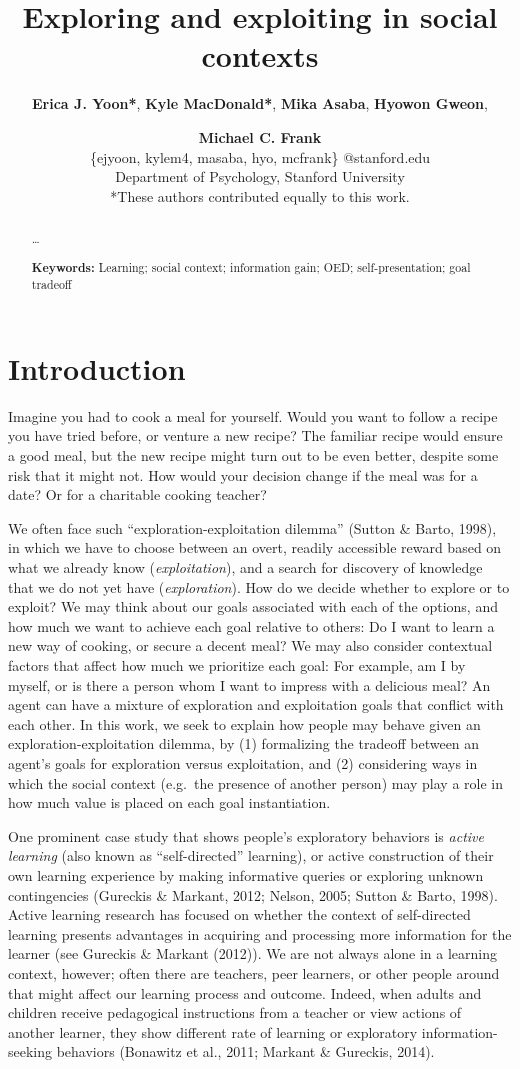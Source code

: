 \documentclass[10pt, letterpaper]{article}
\title{Exploring and exploiting in social contexts}
\author{{\large \bf Erica J. Yoon*}, {\large \bf Kyle MacDonald*}, {\large \bf Mika Asaba}, {\large \bf Hyowon Gweon}, \and {\large \bf Michael C. Frank} \\ \{ejyoon, kylem4, masaba, hyo, mcfrank\} @stanford.edu \\ Department of Psychology, Stanford University \\ *These authors contributed equally to this work.}
\begin{document}
\maketitle

\begin{abstract}
\ldots{}

\textbf{Keywords:}
Learning; social context; information gain; OED; self-presentation; goal
tradeoff
\end{abstract}

\section{Introduction}\label{introduction}

Imagine you had to cook a meal for yourself. Would you want to follow a
recipe you have tried before, or venture a new recipe? The familiar
recipe would ensure a good meal, but the new recipe might turn out to be
even better, despite some risk that it might not. How would your
decision change if the meal was for a date? Or for a charitable cooking
teacher?

We often face such ``exploration-exploitation dilemma'' (Sutton \&
Barto, 1998), in which we have to choose between an overt, readily
accessible reward based on what we already know (\emph{exploitation}),
and a search for discovery of knowledge that we do not yet have
(\emph{exploration}). How do we decide whether to explore or to exploit?
We may think about our goals associated with each of the options, and
how much we want to achieve each goal relative to others: Do I want to
learn a new way of cooking, or secure a decent meal? We may also
consider contextual factors that affect how much we prioritize each
goal: For example, am I by myself, or is there a person whom I want to
impress with a delicious meal? An agent can have a mixture of
exploration and exploitation goals that conflict with each other. In
this work, we seek to explain how people may behave given an
exploration-exploitation dilemma, by (1) formalizing the tradeoff
between an agent's goals for exploration versus exploitation, and (2)
considering ways in which the social context (e.g.~the presence of
another person) may play a role in how much value is placed on each goal
instantiation.

One prominent case study that shows people's exploratory behaviors is
\emph{active learning} (also known as ``self-directed'' learning), or
active construction of their own learning experience by making
informative queries or exploring unknown contingencies (Gureckis \&
Markant, 2012; Nelson, 2005; Sutton \& Barto, 1998). Active learning
research has focused on whether the context of self-directed learning
presents advantages in acquiring and processing more information for the
learner (see Gureckis \& Markant (2012)). We are not always alone in a
learning context, however; often there are teachers, peer learners, or
other people around that might affect our learning process and outcome.
Indeed, when adults and children receive pedagogical instructions from a
teacher or view actions of another learner, they show different rate of
learning or exploratory information-seeking behaviors (Bonawitz et al.,
2011; Markant \& Gureckis, 2014).
\end{document}
